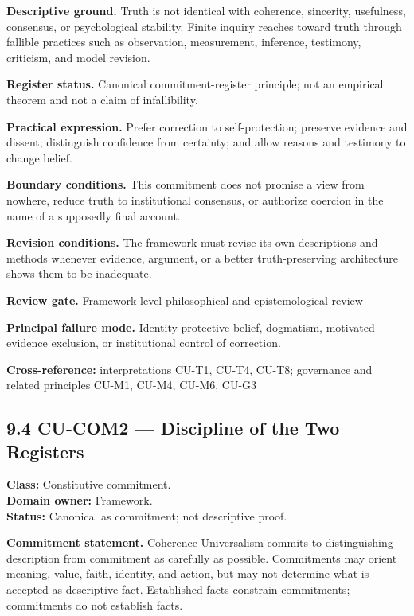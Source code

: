\documentclass[
  11pt,
]{article}
\begin{document}
\textbf{Descriptive ground.} Truth is not identical with coherence,
sincerity, usefulness, consensus, or psychological stability. Finite
inquiry reaches toward truth through fallible practices such as
observation, measurement, inference, testimony, criticism, and model
revision.

\textbf{Register status.} Canonical commitment-register principle; not
an empirical theorem and not a claim of infallibility.

\textbf{Practical expression.} Prefer correction to self-protection;
preserve evidence and dissent; distinguish confidence from certainty;
and allow reasons and testimony to change belief.

\textbf{Boundary conditions.} This commitment does not promise a view
from nowhere, reduce truth to institutional consensus, or authorize
coercion in the name of a supposedly final account.

\textbf{Revision conditions.} The framework must revise its own
descriptions and methods whenever evidence, argument, or a better
truth-preserving architecture shows them to be inadequate.

\textbf{Review gate.} Framework-level philosophical and epistemological
review

\textbf{Principal failure mode.} Identity-protective belief, dogmatism,
motivated evidence exclusion, or institutional control of correction.

\textbf{Cross-reference:} interpretations CU-T1, CU-T4, CU-T8;
governance and related principles CU-M1, CU-M4, CU-M6, CU-G3

\subsection{9.4 CU-COM2 --- Discipline of the Two
Registers}\label{cu-com2-discipline-of-the-two-registers}

\textbf{Class:} Constitutive commitment.\\
\textbf{Domain owner:} Framework.\\
\textbf{Status:} Canonical as commitment; not descriptive proof.

\textbf{Commitment statement.} Coherence Universalism commits to
distinguishing description from commitment as carefully as possible.
Commitments may orient meaning, value, faith, identity, and action, but
may not determine what is accepted as descriptive fact. Established
facts constrain commitments; commitments do not establish facts.
\end{document}

